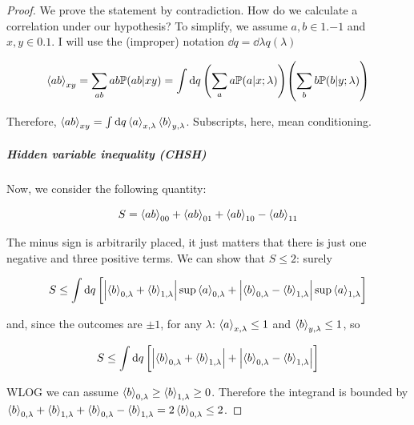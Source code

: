 \documentclass[main.tex]{subfiles}
\begin{document}
\begin{proof}
We prove the statement by contradiction. How do we calculate a correlation under our hypothesis?
To simplify, we assume \(a, b \in \qty{+1,-1}\) and \(x, y \in \qty{0, 1}\).
I will use the (improper) notation \(\dd{q} = \dd{\lambda} q(\lambda)\)

\begin{equation}
    \expval{a b}_{xy} =
    \sum _{ab} a b \mathbb{P}(ab | xy)
    = \int \dd{q}
    \qty(\sum_aa\mathbb{P}(a|x; \lambda) )
    \qty(\sum_bb\mathbb{P}(b|y; \lambda) )
\end{equation}

Therefore, \(\expval{a b}_{xy} = \int   \dd{q} \expval{a}_{x, \lambda} \expval{b}_{y,\lambda}  \). Subscripts, here, mean conditioning.

\subparagraph{Hidden variable inequality (CHSH)}

Now, we consider the following quantity:

\begin{equation} \label{eq:CHSH-def}
    S = \expval{ab}_{00} +
     \expval{ab}_{01} +
     \expval{ab}_{10} -
     \expval{ab}_{11}
\end{equation}

The minus sign is arbitrarily placed, it just matters that there is just one negative and three positive terms. We can show  that \(S \leq 2\): surely

\begin{equation}
    S \leq \int  \dd{q} \qty[
    \abs{\expval{b}_{0, \lambda} + \expval{b}_{1, \lambda}} \sup \expval{a}_{0, \lambda} +
    \abs{\expval{b}_{0, \lambda} - \expval{b}_{1, \lambda}} \sup \expval{a}_{1, \lambda}
    ]
\end{equation}

and, since the outcomes are \(\pm 1\),  for any \(\lambda\): \(\expval{a}_{x, \lambda} \leq 1 \) and \(\expval{b}_{y, \lambda} \leq 1 \), so

\begin{equation}
    S \leq \int  \dd{q} \qty[
    \abs{\expval{b}_{0, \lambda} + \expval{b}_{1, \lambda}} +
    \abs{\expval{b}_{0, \lambda} - \expval{b}_{1, \lambda}}
    ]
\end{equation}

WLOG we can assume \(\expval{b}_{0, \lambda} \geq \expval{b}_{1, \lambda} \geq 0\). Therefore the integrand is bounded by \(\expval{b}_{0, \lambda} + \expval{b}_{1, \lambda} +
\expval{b}_{0, \lambda} - \expval{b}_{1, \lambda} = 2 \expval{b}_{0, \lambda} \leq 2\).


\end{proof}
\end{document}
